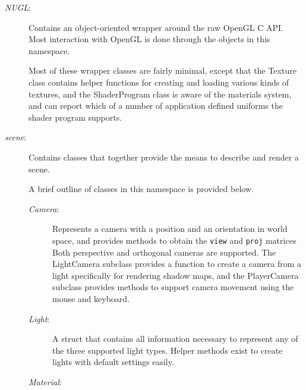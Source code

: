 \documentclass[11pt]{scrartcl} %
\newcommand{\code}[1]{{\texttt{#1}}}
\newcommand{\codefile}[1]{{\textit{#1}}}
\begin{document}
    \begin{description}

        \item[\codefile{NUGL}:]

            Contains an object-oriented wrapper around the raw OpenGL C API.
            Most interaction with OpenGL is done through the objects in this
            namespace.

            Most of these wrapper classes are fairly minimal, except that the
            Texture class contains helper functions for creating and loading
            various kinds of textures, and the ShaderProgram class is aware of
            the materials system, and can report which of a number of
            application defined uniforms the shader program supports.

        \item[\codefile{scene}:]

            Contains classes that together provide the means to describe and render a scene.

            A brief outline of classes in this namespace is provided below.

            \begin{description}

                \item[\codefile{Camera}:]

                    Represents a camera with a position and an orientation in
                    world space, and provides methods to obtain the \code{view}
                    and \code{proj} matrices Both perspective and orthogonal
                    cameras are supported. The LightCamera subclass provides a
                    function to create a camera from a light specifically for
                    rendering shadow maps, and the PlayerCamera subclass
                    provides methods to support camera movement using the mouse
                    and keyboard.

                \item[\codefile{Light}:]

                    A struct that contains all information necessary to
                    represent any of the three supported light types. Helper
                    methods exist to create lights with default settings
                    easily.

                \item[\codefile{Material}:]


\end{description}
\end{description}
\end{document}
